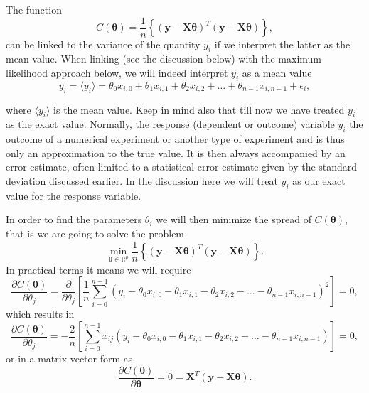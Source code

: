 \documentclass[%
oneside,                 %
final,                   %
10pt]{article}
\newenvironment{block_mdfboxadmon}[1][]{
\begin{block_mdfboxmdframed}[frametitle=#1]
}
{
\end{block_mdfboxmdframed}
}
\begin{document}
\begin{block_mdfboxadmon}[]

The function 
\[
C(\bm{\theta})=\frac{1}{n}\left\{\left(\bm{y}-\bm{X}\bm{\theta}\right)^T\left(\bm{y}-\bm{X}\bm{\theta}\right)\right\},
\]
can be linked to the variance of the quantity $y_i$ if we interpret the latter as the mean value. 
When linking (see the discussion below) with the maximum likelihood approach below, we will indeed interpret $y_i$ as a mean value
\[
y_{i}=\langle y_i \rangle = \theta_0x_{i,0}+\theta_1x_{i,1}+\theta_2x_{i,2}+\dots+\theta_{n-1}x_{i,n-1}+\epsilon_i,
\]

where $\langle y_i \rangle$ is the mean value. Keep in mind also that
till now we have treated $y_i$ as the exact value. Normally, the
response (dependent or outcome) variable $y_i$ the outcome of a
numerical experiment or another type of experiment and is thus only an
approximation to the true value. It is then always accompanied by an
error estimate, often limited to a statistical error estimate given by
the standard deviation discussed earlier. In the discussion here we
will treat $y_i$ as our exact value for the response variable.

In order to find the parameters $\theta_i$ we will then minimize the spread of $C(\bm{\theta})$, that is we are going to solve the problem
\[
{\displaystyle \min_{\bm{\theta}\in
{\mathbb{R}}^{p}}}\frac{1}{n}\left\{\left(\bm{y}-\bm{X}\bm{\theta}\right)^T\left(\bm{y}-\bm{X}\bm{\theta}\right)\right\}.
\]
In practical terms it means we will require
\[
\frac{\partial C(\bm{\theta})}{\partial \theta_j} = \frac{\partial }{\partial \theta_j}\left[ \frac{1}{n}\sum_{i=0}^{n-1}\left(y_i-\theta_0x_{i,0}-\theta_1x_{i,1}-\theta_2x_{i,2}-\dots-\theta_{n-1}x_{i,n-1}\right)^2\right]=0, 
\]
which results in
\[
\frac{\partial C(\bm{\theta})}{\partial \theta_j} = -\frac{2}{n}\left[ \sum_{i=0}^{n-1}x_{ij}\left(y_i-\theta_0x_{i,0}-\theta_1x_{i,1}-\theta_2x_{i,2}-\dots-\theta_{n-1}x_{i,n-1}\right)\right]=0, 
\]
or in a matrix-vector form as
\[
\frac{\partial C(\bm{\theta})}{\partial \bm{\theta}} = 0 = \bm{X}^T\left( \bm{y}-\bm{X}\bm{\theta}\right).  
\]
\end{block_mdfboxadmon} %




\end{document}
